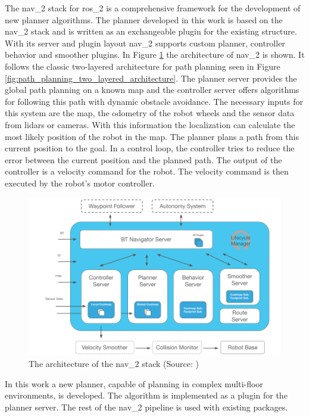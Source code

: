 The \gls{nav_2} stack for \gls{ros_2} is a comprehensive framework for the development of new planner algorithms. The planner developed in this work is based on the \gls{nav_2} stack and is written as an exchangeable plugin for the existing structure. With its server and plugin layout \gls{nav_2} supports custom planner, controller behavior and smoother plugins. In Figure \ref{fig:nav2_architecture} the architecture of \gls{nav_2} is shown. It follows the classic two-layered architecture for path planning seen in Figure \ref{fig:path_planning_two_layered_architecture}. The planner server provides the global path planning on a known map and the controller server offers algorithms for following this path with dynamic obstacle avoidance. The necessary inputs for this system are the map, the odometry of the robot wheels and the sensor data from lidars or cameras. With this information the localization can calculate the most likely position of the robot in the map. The planner plans a path from this current position to the goal. In a control loop, the controller tries to reduce the error between the current position and the planned path. The output of the controller is a velocity command for the robot. The velocity command is then executed by the robot's motor controller.

\begin{figure}[h]
    \centering
    \includegraphics[width=\textwidth]{figures/20_state_of_the_art/nav2_architecture.png}
    \caption[The architecture of the \gls{nav_2} stack]{The architecture of the \gls{nav_2} stack (Source: \cite{steve_macenski_navigation_2020})}
    \label{fig:nav2_architecture}
\end{figure}

In this work a new planner, capable of planning in complex multi-floor environments, is developed. The algorithm is implemented as a plugin for the planner server. The rest of the \gls{nav_2} pipeline is used with existing packages.

